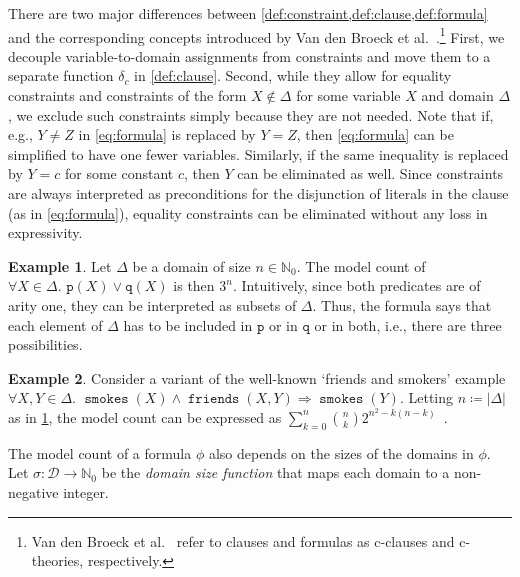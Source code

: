 \documentclass{article}
\theoremstyle{definition}
\newtheorem{example}{Example}
\theoremstyle{remark}
\DeclareMathOperator{\friends}{\texttt{friends}}
\DeclareMathOperator{\smokes}{\texttt{smokes}}
\begin{document}
There are two major differences between
\cref{def:constraint,def:clause,def:formula} and the corresponding concepts
introduced by Van den Broeck et
al.~.\footnote{Van den Broeck et
  al.~ refer to clauses and formulas as
  c-clauses and c-theories, respectively.} First, we decouple variable-to-domain
assignments from constraints and move them to a separate function $\delta_{c}$
in \cref{def:clause}. Second, while they allow for equality constraints and
constraints of the form $X \not\in \Delta$ for some variable $X$ and domain
$\Delta$, we exclude such constraints simply because they are not needed. Note
that if, e.g., $Y \ne Z$ in \cref{eq:formula} is replaced by $Y = Z$, then
\cref{eq:formula} can be simplified to have one fewer variables. Similarly, if
the same inequality is replaced by $Y = c$ for some constant $c$, then $Y$ can
be eliminated as well. Since constraints are always interpreted as preconditions
for the disjunction of literals in the clause (as in \cref{eq:formula}),
equality constraints can be eliminated without any loss in expressivity.

\begin{example}\label{example:simple}
  Let $\Delta$ be a domain of size $n \in \mathbb{N}_{0}$. The model count of
  $\forall X \in \Delta\text{. } \texttt{p}(X) \lor \texttt{q}(X)$ is then
  $3^{n}$. Intuitively, since both predicates are of arity one, they can be
  interpreted as subsets of $\Delta$. Thus, the formula says that each element
  of $\Delta$ has to be included in $\texttt{p}$ or in $\texttt{q}$ or in both,
  i.e., there are three possibilities.
\end{example}

\begin{example}\label{example:smokers}
  Consider a variant of the well-known `friends and smokers' example
  $\forall X, Y \in \Delta\text{.
  } \smokes(X) \land \friends(X, Y) \Rightarrow \smokes(Y)$. Letting
  $n \coloneqq |\Delta|$ as in \cref{example:simple}, the model count can be
  expressed as
  $\sum_{k=0}^{n} \binom{n}{k}2^{n^{2} - k(n-k)}$~\cite{DBLP:conf/kr/BroeckMD14}.
\end{example}

The model count of a formula $\phi$ also depends on the sizes of the domains in
$\phi$. Let $\sigma\colon \mathcal{D} \to \mathbb{N}_{0}$ be the \emph{domain
  size function} that maps each domain to a non-negative integer.
\end{document}

